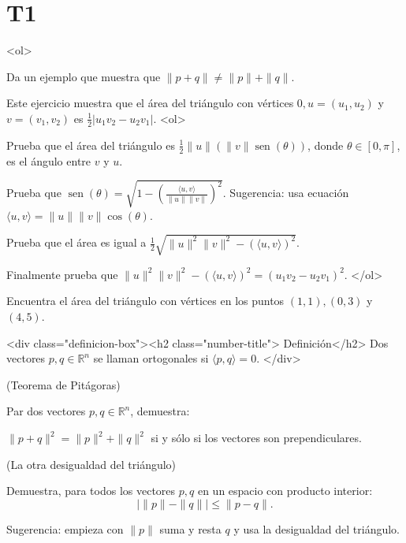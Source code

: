 \documentclass{article}
\theoremstyle{definition}
\newcommand{\sen}{\operatorname{sen}}
\begin{document}
  \section*{T1}

	<ol>

		\item Da un ejemplo que muestra que $\|p+q\|\ne \|p\|+\|q\|$.	


 \item Este ejercicio muestra que el área del triángulo con vértices  $0, u=(u_1,u_2)$ y $v=(v_1,v_2)$
       es $\frac{1}{2}|u_1v_2-u_2v_1|$.
       <ol>
       \item Prueba que el área del triángulo es $\frac{1}{2}\|u\|(\|v\| \sen(\theta))$,
         donde $\theta\in [0,\pi]$, es el ángulo entre $v$ y $u$.
       \item Prueba que $\sen(\theta)=\sqrt{1- \left( \frac{\langle u , v \rangle }{\|u\|\|v\|} \right)^2}$.
       Sugerencia: usa ecuación $\langle u, v \rangle=\|u\|\|v\|\cos(\theta)$.
       \item Prueba que el área es igual a $\frac{1}{2}\sqrt{\|u\|^2\|v\|^2-(\langle u,  v\rangle )^2}$.
       \item Finalmente prueba que $\|u\|^2\|v\|^2-(\langle u,  v\rangle )^2=(u_1v_2-u_2v_1)^2$.
       </ol>
       
        \item Encuentra el área del triángulo con vértices en los puntos $(1,1), (0,3)$ y $(4,5)$.
	
	
         <div class="definicion-box"><h2 class="number-title">  Definición</h2>
           Dos vectores $p,q\in \mathbb{R}^n$ se llaman ortogonales si $\langle p,q \rangle=0$.
         </div>
         
         
       \item (Teorema de Pitágoras)

         Par dos vectores $p, q \in \mathbb{R}^n$, demuestra:

         $\|p+q\|^2=\|p\|^2+\|q\|^2$ si y sólo si los vectores son prependiculares.

 \item (La otra desigualdad del triángulo)

                Demuestra, para todos  los vectores $p,q$ en un espacio con producto interior:
                $$
                |\|p\| - \|q\|| \leq \|p-q\|.
                $$

                Sugerencia: empieza con $\|p\|$ suma  y resta $q$ y usa la desigualdad del triángulo.	
\end{document}
